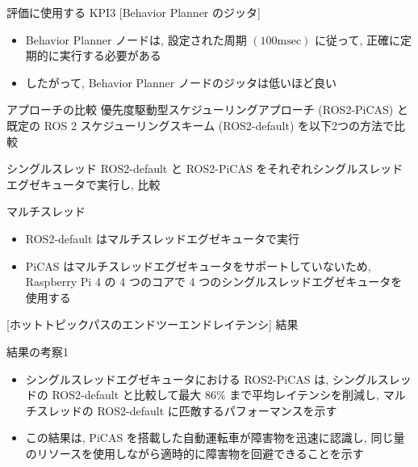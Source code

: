 \begin{frame}{評価に使用する KPI3 [Behavior Planner のジッタ]}
    \begin{itemize}
        \item Behavior Planner ノードは, 設定された周期 $(100 \mathrm{msec})$ に従って, 正確に定期的に実行する必要がある
        \item したがって, Behavior Planner ノードのジッタは低いほど良い
    \end{itemize}
\end{frame}

\begin{frame}{アプローチの比較}
    \vspace{-1mm}
    優先度駆動型スケジューリングアプローチ (ROS2-PiCAS) と既定の ROS 2 スケジューリングスキーム (ROS2-default) を以下2つの方法で比較
    \vspace{-1mm}
    \begin{block}{シングルスレッド}
        ROS2-default と ROS2-PiCAS をそれぞれシングルスレッドエグゼキュータで実行し, 比較
    \end{block}
    \begin{block}{マルチスレッド}
        \begin{itemize}
            \item ROS2-default はマルチスレッドエグゼキュータで実行
            \item PiCAS はマルチスレッドエグゼキュータをサポートしていないため, Raspberry Pi 4 の 4 つのコアで 4 つのシングルスレッドエグゼキュータを使用する
        \end{itemize}
    \end{block}
\end{frame}

\begin{frame}{[ホットトピックパスのエンドツーエンドレイテンシ] 結果}
\end{frame}

\begin{frame}{結果の考察1}
    \begin{itemize}
        \item シングルスレッドエグゼキュータにおける ROS2-PiCAS は, シングルスレッドの ROS2-default と比較して最大 $86 \%$ まで平均レイテンシを削減し, マルチスレッドの ROS2-default に匹敵するパフォーマンスを示す
        \item この結果は, PiCAS を搭載した自動運転車が障害物を迅速に認識し, 同じ量のリソースを使用しながら適時的に障害物を回避できることを示す
    \end{itemize}
\end{frame}

